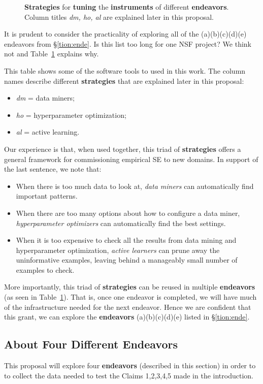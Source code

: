 \documentclass{NSF}
\newenvironment{myitemize}
{ \begin{itemize}
    \setlength{\itemsep}{0pt}
    \setlength{\parskip}{0pt}
    \setlength{\parsep}{0pt}     }
{ \end{itemize}                  }
\newcommand{\bi}{\begin{myitemize}}
\newcommand{\ei}{\end{myitemize}}
\newcommand{\tion}[1]{\S\ref{tion:#1}}
\newcommand{\tbl}[1]{Table~\ref{tbl:#1}}
\begin{document}
\begin{nsfdescription}
\begin{figure}
\begin{center}
{\begin{tabular}{c|c|ccc}
\end{tabular}}
\end{center}
\caption{{\bf Strategies} for {\bf tuning} the {\bf instruments} of different {\bf endeavors}.
Column titles {\em dm, ho, al} are explained later in this proposal. }
\label{tbl:reuse}
\vspace{-20mm}
\end{figure}
It is prudent to consider the practicality of exploring
all of the (a)(b)(c)(d)(e) endeavors from \tion{ende}. Is this list too long for
one NSF project? We think not and   \tbl{reuse} explains why.

This table shows   some of the software tools
to used in this work. 
The column names describe different {\bf strategies} that are explained later in this proposal:
\bi
\item {\em dm} = data miners; 
\item {\em ho} = hyperparameter optimization;
\item {\em al} = active learning.
\ei
Our experience is that,
when used together, this triad of {\bf strategies}
offers a general framework for commissioning
empirical SE to new domains. In support  of
the last sentence,  we note that:
\bi
\item When there is too much data to look at,
{\em data miners} can automatically find important patterns.
\item When there are too many options about how
to configure a data miner, 
{\em hyperparameter optimizers} can automatically find the best settings.
\item 
When it is too expensive to check all the results
from data mining and hyperparameter optimization,
{\em active learners} can prune away the uninformative examples, leaving behind  a manageably
small number of examples to check.
\ei
More importantly, this triad
of {\bf strategies} can be reused
in multiple {\bf endeavors} (as seen in \tbl{reuse}).  That is, 
once one endeavor is completed, we will have much of the infrastructure needed for the next endeavor.
Hence we are confident that  this grant,
we can explore the {\bf endeavors}  (a)(b)(c)(d)(e) 
listed in  \tion{ende}.



\subsection{About Four Different Endeavors}\label{tion:four}
This proposal will explore  four
{\bf endeavors} (described in this section)
in order to 
to collect the data needed to test the  Claims 1,2,3,4,5 made in the introduction. 



\end{nsfdescription}
\end{document}
